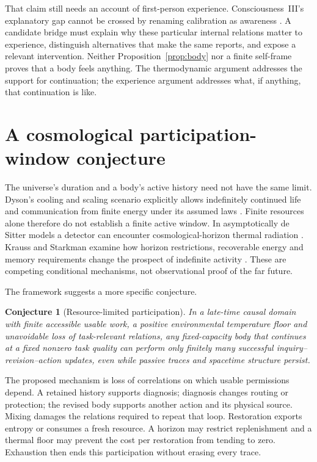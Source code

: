 \documentclass[12pt,a4paper]{article}
\newtheorem{conjecture}{Conjecture}
\begin{document}
That claim still needs an account of first-person experience. Consciousness~III's explanatory gap cannot be crossed by renaming calibration as awareness \cite{Consciousness}. A candidate bridge must explain why these particular internal relations matter to experience, distinguish alternatives that make the same reports, and expose a relevant intervention. Neither Proposition~\ref{prop:body} nor a finite self-frame proves that a body feels anything. The thermodynamic argument addresses the support for continuation; the experience argument addresses what, if anything, that continuation is like.

\section{A cosmological participation-window conjecture}

The universe's duration and a body's active history need not have the same limit. Dyson's cooling and scaling scenario explicitly allows indefinitely continued life and communication from finite energy under its assumed laws \cite{Dyson}. Finite resources alone therefore do not establish a finite active window. In asymptotically de Sitter models a detector can encounter cosmological-horizon thermal radiation \cite{GH}. Krauss and Starkman examine how horizon restrictions, recoverable energy and memory requirements change the prospect of indefinite activity \cite{KS}. These are competing conditional mechanisms, not observational proof of the far future.

The framework suggests a more specific conjecture.

\begin{conjecture}[Resource-limited participation]
In a late-time causal domain with finite accessible usable work, a positive environmental temperature floor and unavoidable loss of task-relevant relations, any fixed-capacity body that continues at a fixed nonzero task quality can perform only finitely many successful inquiry--revision--action updates, even while passive traces and spacetime structure persist.
\end{conjecture}

The proposed mechanism is loss of correlations on which usable permissions depend. A retained history supports diagnosis; diagnosis changes routing or protection; the revised body supports another action and its physical source. Mixing damages the relations required to repeat that loop. Restoration exports entropy or consumes a fresh resource. A horizon may restrict replenishment and a thermal floor may prevent the cost per restoration from tending to zero. Exhaustion then ends this participation without erasing every trace.
\end{document}
